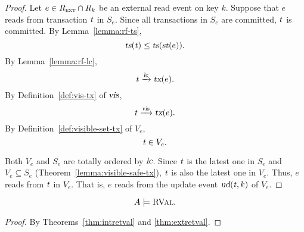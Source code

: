 \begin{proof} \label{proof:extretval}
  Let $e \in R_{\textsc{ext}} \cap R_{k}$
  be an external read event on key $k$.
  Suppose that $e$ reads from transaction $\mathit{t}$ in $S_{e}$.
  Since all transactions in $S_{e}$ are committed,
  $\mathit{t}$ is committed.
  By Lemma~\ref{lemma:rf-ts},
  \[
    \textsl{ts}(\mathit{t}) \le \textsl{ts}(\textsl{st}(e)).
  \]
  By Lemma~\ref{lemma:rf-lc},
  \[
    \mathit{t} \xrightarrow{\textsl{lc}} \textsl{tx}(e).
  \]
  By Definition~\ref{def:vis-tx} of $\textsl{vis}$,
  \[
    \mathit{t} \xrightarrow{\textsl{vis}} \textsl{tx}(e).
  \]
  By Definition~\ref{def:visible-set-tx} of $V_{e}$,
  \[
    \mathit{t} \in V_{e}.
  \]

  Both $V_{e}$ and $S_{e}$
  are totally ordered by $\textsl{lc}$.
  Since $\mathit{t}$ is the latest one in $S_{e}$
  and $V_{e} \subseteq S_{e}$
  (Theorem~\ref{lemma:visible-safe-tx}),
  $\mathit{t}$ is also the latest one in $V_{e}$.
  Thus, $e$ reads from $\mathit{t}$ in $V_{e}$.
  That is, $e$ reads from the update event
  $\textsl{ud}(\mathit{t}, k)$ of $V_{e}$.
\end{proof}

\begin{apptheorem} \label{thm:retval}
  \[
    A \models \textsc{RVal}.
  \]
\end{apptheorem}

\begin{proof} \label{proof:retval}
 By Theorems~\ref{thm:intretval} and \ref{thm:extretval}.
\end{proof}

